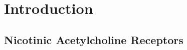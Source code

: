 \documentclass[10pt, letterpaper]{article}
\begin{document}
\section{Introduction}






\fancyhf{}
\fancyhead[R]{\thepage}
\subsection{Nicotinic Acetylcholine Receptors}



\end{document}
